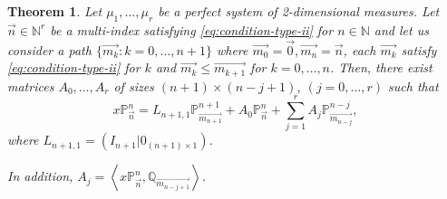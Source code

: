 \documentclass[12pt,a4]{article}
\theoremstyle{plain}
\newtheorem{theorem}{Theorem}[section]
\newcommand{\N}[0]{\mathbb{N}}
\newcommand{\prodesc}[2]{\left\langle #1 , #2 \right\rangle}
\begin{document}
\begin{theorem} 
    Let $\mu_1,\dots,\mu_r$ be a perfect system of 2-dimensional measures. Let $\vec n\in \N^r$ be a multi-index satisfying \eqref{eq:condition-type-ii} for $n\in\N$ and let us consider a path $\{\overrightarrow{m_k}:k=0,\dots,n+1\}$ where $\overrightarrow{m_0}=\vec 0, \overrightarrow{m_n} = \vec n$, each $\overrightarrow{m_k}$ satisfy \eqref{eq:condition-type-ii} for $k$ and $\overrightarrow{m_k} \leq \overrightarrow{m_{k+1}}$ for $k=0,\dots,n$. Then, there exist matrices $A_0,\dots,A_r$ of sizes $(n+1)\times(n-j+1)$,  $(j=0,\dots,r)$ such that
    \begin{equation}
        \label{eq:nearest-neighbor}
        x\mathbb P_{\vec n}^n = L_{{n+1},1} \mathbb P_{\overrightarrow{m_{n+1}}}^{n+1} + A_0 \mathbb P_{\vec n}^n + \sum_{j=1}^r A_j \mathbb P_{\overrightarrow{m_{n-j}}}^{n-j},
    \end{equation}
    where $L_{n+1,1}=(I_{n+1}|0_{(n+1)\times 1})$.

    In addition, $A_j = \prodesc{x\mathbb P_{\vec n}^n}{\mathbb Q_{\overrightarrow{m_{n-j+1}}}}$.
\end{theorem}
\end{document}
